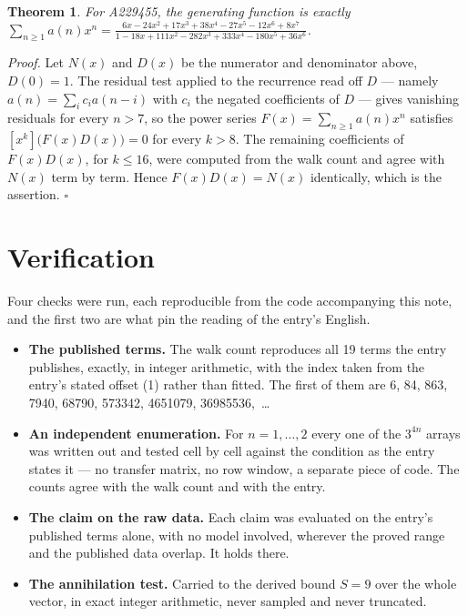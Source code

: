 \documentclass[11pt]{article}
\newtheorem{theorem}{Theorem}
\theoremstyle{definition}
\begin{document}
\begin{theorem} For A229455, the generating function is exactly $\sum_{n\ge 1} a(n)x^n = \frac{6x - 24x^{2} + 17x^{3} + 38x^{4} - 27x^{5} - 12x^{6} + 8x^{7}}{1 - 18x + 111x^{2} - 282x^{3} + 333x^{4} - 180x^{5} + 36x^{6}}$.\end{theorem}

{\itshape Proof.} Let $N(x)$ and $D(x)$ be the numerator and denominator above, $D(0)=1$. The residual test applied to the recurrence read off $D$ --- namely $a(n) = \sum_i c_i a(n-i)$ with $c_i$ the negated coefficients of $D$ --- gives vanishing residuals for every $n > 7$, so the power series $F(x)=\sum_{n\ge 1}a(n)x^n$ satisfies $[x^k]\bigl(F(x)D(x)\bigr) = 0$ for every $k > 8$. The remaining coefficients of $F(x)D(x)$, for $k \le 16$, were computed from the walk count and agree with $N(x)$ term by term. Hence $F(x)D(x) = N(x)$ identically, which is the assertion. $\square$

\section{Verification}

Four checks were run, each reproducible from the code accompanying this note, and the first two are what pin the reading of the entry's English.

\begin{itemize}

\item {\bfseries The published terms.} The walk count reproduces all 19 terms the entry publishes, exactly, in integer arithmetic, with the index taken from the entry's stated offset (1) rather than fitted. The first of them are 6, 84, 863, 7940, 68790, 573342, 4651079, 36985536,~\dots

\item {\bfseries An independent enumeration.} For $n = 1,\dots,2$ every one of the $3^{4n}$ arrays was written out and tested cell by cell against the condition as the entry states it --- no transfer matrix, no row window, a separate piece of code. The counts agree with the walk count and with the entry.

\item {\bfseries The claim on the raw data.} Each claim was evaluated on the entry's published terms alone, with no model involved, wherever the proved range and the published data overlap. It holds there.

\item {\bfseries The annihilation test.} Carried to the derived bound $S = 9$ over the whole vector, in exact integer arithmetic, never sampled and never truncated.

\end{itemize}
\end{document}
